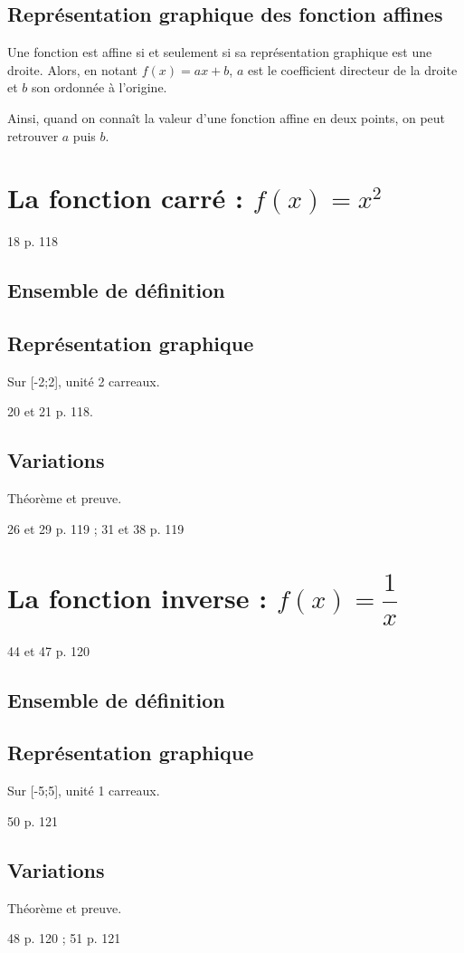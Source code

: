 \documentclass[a4paper,11pt,DIV18,BCOR0mm]{scrartcl}
\begin{document}
\subsection{Représentation graphique des fonction affines}
\begin{theoreme}[Admis]
 Une fonction est affine si et seulement si sa représentation graphique est une droite.
Alors, en notant $f(x)=ax+b$, $a$ est le coefficient directeur de la droite et $b$ son ordonnée à l'origine.
\end{theoreme}
\begin{exemple}
\end{exemple}



Ainsi, quand on connaît la valeur d'une fonction affine en deux points, on peut retrouver $a$ puis $b$.




\section{La fonction carré : $f(x)=x^2$}
\begin{exercice}
 18 p. 118
\end{exercice}
\subsection{Ensemble de définition}
\subsection{Représentation graphique}
Sur [-2;2], unité 2 carreaux.
\begin{exercice}
 20 et 21 p. 118.
\end{exercice}

\subsection{Variations}
Théorème et preuve.
\begin{exercice}
 26 et 29 p. 119 ; 31 et 38 p. 119 
\end{exercice}

\section{La fonction inverse : $f(x)=\dfrac{1}{x}$}
\begin{exercice}
 44 et 47 p. 120
\end{exercice}
\subsection{Ensemble de définition}
\subsection{Représentation graphique}
Sur [-5;5], unité 1 carreaux.
\begin{exercice}
 50 p. 121
\end{exercice}

\subsection{Variations}
Théorème et preuve.
\begin{exercice}
 48 p. 120 ; 51 p. 121 
\end{exercice}
\end{document}

